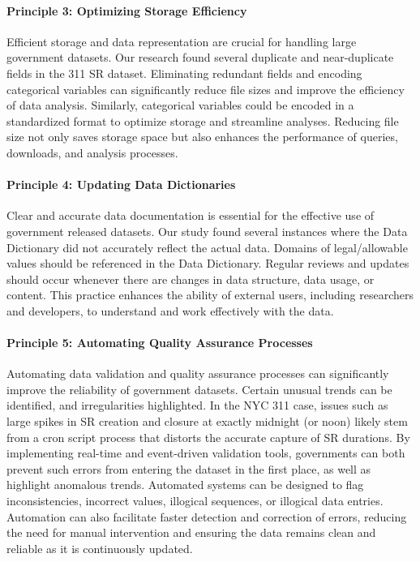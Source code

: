 \documentclass[linenumber]{jdsart}
\begin{document}
\paragraph{Principle 3: Optimizing Storage Efficiency}
Efficient storage and data representation are crucial for handling 
large government datasets. Our research found several duplicate and
near-duplicate fields in the 311 SR dataset. Eliminating 
redundant fields and encoding categorical variables can 
significantly reduce file sizes and improve the efficiency 
of data analysis. Similarly, categorical variables could be 
encoded in a standardized format to optimize storage and 
streamline analyses. Reducing file size not only saves 
storage space but also enhances the performance of queries, 
downloads,  and analysis processes.


\paragraph{Principle 4: Updating Data Dictionaries}
Clear and accurate data documentation is essential for the effective use 
of government released datasets. Our study found several 
instances where the Data Dictionary did not accurately reflect the 
actual data. Domains of legal/allowable values should be referenced
in the Data Dictionary. Regular reviews and updates should 
occur whenever there are changes in data structure, data usage, or 
content. This practice enhances the ability of external users, 
including researchers and developers, to understand and work 
effectively with the data.

\paragraph{Principle 5: Automating Quality Assurance Processes}
Automating data validation and quality assurance processes can 
significantly improve the reliability of government datasets. Certain
unusual trends can be identified, and irregularities highlighted. 
In the NYC 311 case, issues such as large spikes in SR 
creation and closure at exactly midnight (or noon) likely 
stem from a cron script process that distorts the 
accurate capture of SR durations. By implementing 
real-time and event-driven validation tools, governments 
can both prevent such errors from entering the dataset in the first 
place, as well as highlight anomalous trends. Automated 
systems can be designed to flag inconsistencies, incorrect values, 
illogical sequences, or illogical data entries. Automation can 
also facilitate faster detection and correction of errors, reducing 
the need for manual intervention and ensuring the data 
remains clean and reliable as it is continuously updated.
\end{document}
